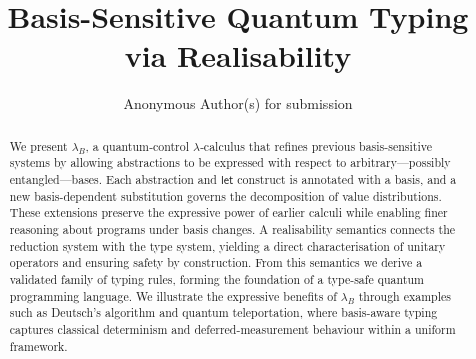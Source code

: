 \documentclass[runningheads,orivec,envcountsame,envcountsect]{llncs}
\newcommand{\lambdaB}{\lambda_B}
\begin{document}
\title{Basis-Sensitive Quantum Typing via Realisability}

\author{Anonymous Author(s) for submission}

%
%

\maketitle 

\begin{abstract}
  We present $\lambdaB$, a quantum‐control $\lambda$‐calculus that refines
  previous basis-sensitive systems by allowing abstractions to be expressed with
  respect to arbitrary---possibly entangled---bases.  Each abstraction and
  $\mathsf{let}$ construct is annotated with a basis, and a new basis-dependent
  substitution governs the decomposition of value distributions.  These
  extensions preserve the expressive power of earlier calculi while enabling
  finer reasoning about programs under basis changes.  A realisability semantics
  connects the reduction system with the type system, yielding a direct
  characterisation of unitary operators and ensuring safety by construction.
  From this semantics we derive a validated family of typing rules, forming the
  foundation of a type-safe quantum programming language.  We illustrate the
  expressive benefits of $\lambdaB$ through examples such as Deutsch’s algorithm
  and quantum teleportation, where basis-aware typing captures classical
  determinism and deferred-measurement behaviour within a uniform framework.

\end{abstract}
\end{document}
